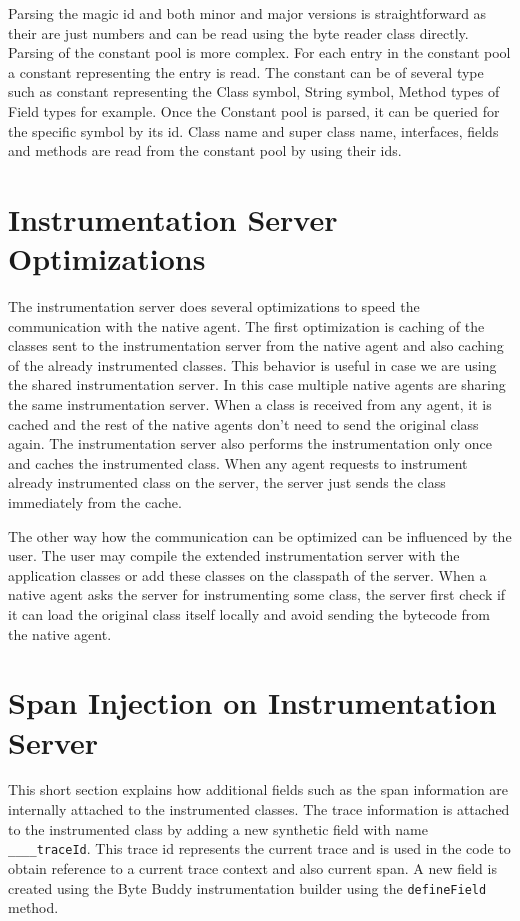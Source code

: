 Parsing the magic id and both minor and major versions is straightforward as their are just numbers and can be read using the byte reader class directly. Parsing of the constant pool is more complex. For each entry in the constant pool a constant representing the entry is read. The constant can be of several type such as constant representing the Class symbol, String symbol, Method types of Field types for example. Once the Constant pool is parsed, it can be queried for the specific symbol by its id. Class name and super class name, interfaces, fields and methods are read from the constant pool by using their ids.

\section{Instrumentation Server Optimizations}
The instrumentation server does several optimizations to speed the communication with the native agent. The first optimization is caching of the classes sent to the instrumentation server from the native agent and also caching of the already instrumented classes. This behavior is useful in case we are using the shared instrumentation server. In this case multiple native agents are sharing the same instrumentation server. When a class is received from any agent, it is cached and the rest of the native agents don't need to send the original class again. The instrumentation server also performs the instrumentation only once and caches the instrumented class. When any agent requests to instrument already instrumented class on the server, the server just sends the class immediately from the cache.

The other way how the communication can be optimized can be influenced by the user. The user may compile the extended instrumentation server with the application classes or add these classes on the classpath of the server. When a native agent asks the server for instrumenting some class, the server first check if it can load the original class itself locally and avoid sending the bytecode from the native agent. 
\section{Span Injection on Instrumentation Server}
This short section explains how additional fields such as the span information are internally attached to the instrumented classes. The trace information is attached to the instrumented class by adding a new synthetic field with name \texttt{\_\_\_\_traceId}. This trace id represents the current trace and is used in the code to obtain reference to a current trace context and also current span.  A new field is created using the Byte Buddy instrumentation builder using the \texttt{defineField} method.
